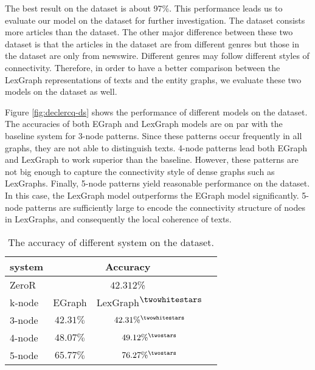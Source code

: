 The best result on the \pitlerds dataset is about 97\%. 
This performance leads us to evaluate our model on the \declercqds dataset for further investigation. 
The \declercqds dataset consists more articles than the \pitlerds dataset. 
The other major difference between these two dataset is that the articles in the \declercqds dataset are from different genres but those in the \pitlerds dataset are only from newswire. 
Different genres may follow different styles of connectivity. 
Therefore, in order to have a better comparison between the LexGraph representations of texts and the entity graphs, we evaluate these two models on the \declercqds dataset as well. 

Figure \ref{fig:declercq-ds} shows the performance of different models on the \declercqds dataset.   
The accuracies of both EGraph and LexGraph models are on par with the baseline system for 3-node patterns. 
Since these patterns occur frequently in all graphs, they are not able to distinguish texts. 
4-node patterns lead both EGraph and LexGraph to work superior than the baseline. 
However, these patterns are not big enough to capture the connectivity style of dense graphs such as LexGraphs. 
Finally, 5-node patterns yield reasonable performance on the \declercqds dataset. 
In this case, the LexGraph model outperforms the EGraph model significantly. 
5-node patterns are sufficiently large to encode the connectivity structure of nodes in LexGraphs, and consequently the local coherence of texts. 

\begin{table}[!ht]
  \begin{center}
    \begin{tabular}{lccc}
    \hline
    system  & \multicolumn{2}{c}{Accuracy}              \\
    \hline  
    ZeroR   & \multicolumn{2}{c}{$42.312$\%}            \\
    \hline
    k-node  & EGraph	  & LexGraph\textsuperscript{$\twowhitestars$}     \\\hline

    3-node  & $42.31\%$ & $42.31\%^\twowhitestars$       \\
    4-node  & $48.07\%$ & $49.12\%^\twostars$            \\
    5-node  & $65.77\%$ & $76.27\%^\twostars$	           \\
    \hline
    \end{tabular}
  \end{center}
  \caption{The accuracy of different system on the \declercqds dataset.}
  \label{tab:declercq-ds}
\end{table}

